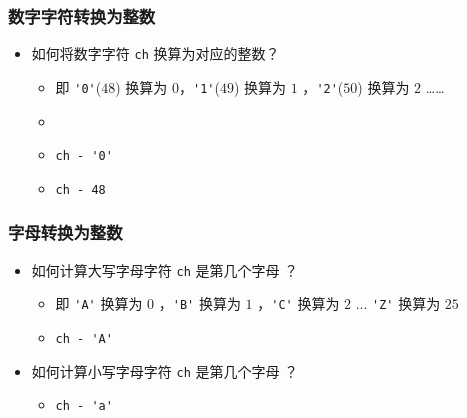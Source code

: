 \begin{frame}[fragile]
    \frametitle{数字字符转换为整数}

    \begin{itemize}
        \item 如何将数字字符 \lstinline|ch| 换算为对应的整数？
        
        \begin{itemize}
            \item 即 \lstinline|'0'|($48$) 换算为 $0$，\lstinline|'1'|($49$) 换算为 $1$ ，\lstinline|'2'|($50$) 换算为 $2$ ……
            \item {}
            \item<4-> \lstinline|ch - '0'|
            \item<4-> \lstinline|ch - 48|
        \end{itemize}

    \end{itemize}

\end{frame}

\begin{frame}[fragile]
    \frametitle{字母转换为整数}

    \begin{itemize}
        \item 如何计算大写字母字符 \lstinline|ch| 是第几个字母 ？
        
        \begin{itemize}
            \item 即 \lstinline|'A'| 换算为 $0$ ，\lstinline|'B'| 换算为 $1$ ，\lstinline|'C'| 换算为 $2$ ... \lstinline|'Z'| 换算为 $25$
            \item<2-> \lstinline|ch - 'A'|
        \end{itemize}

        \item<3-> 如何计算小写字母字符 \lstinline|ch| 是第几个字母 ？
        
        \begin{itemize}
            \item<4-> \lstinline|ch - 'a'|
        \end{itemize}

    \end{itemize}

\end{frame}

